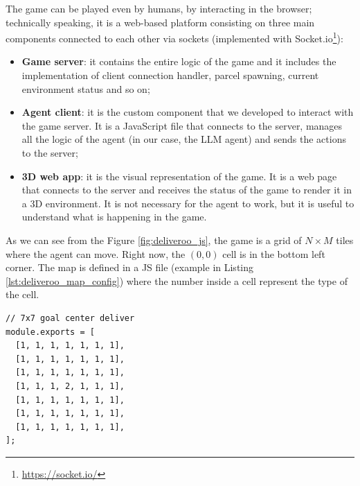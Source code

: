 The game can be played even by humans, by interacting in the browser; technically
speaking, it is a web-based platform consisting on three main components
connected to each other via sockets (implemented with Socket.io\footnote{\url{https://socket.io/}}):
\begin{itemize}
  \item \textbf{Game server}: it contains the entire logic of the game and it includes
    the implementation of client connection handler, parcel spawning, current environment
    status and so on;

  \item \textbf{Agent client}: it is the custom component that we developed to interact
    with the game server. It is a JavaScript file that connects to the server, manages
    all the logic of the agent (in our case, the LLM agent) and sends the
    actions to the server;

  \item \textbf{3D web app}: it is the visual representation of the game. It is
    a web page that connects to the server and receives the status of the game
    to render it in a 3D environment. It is not necessary for the agent to work,
    but it is useful to understand what is happening in the game.
\end{itemize}

As we can see from the Figure \ref{fig:deliveroo_js}, the game is a grid of
$N \times M$ tiles where the agent can move. Right now, the $(0, 0)$ cell is in
the bottom left corner. The map is defined in a JS file (example in Listing
\ref{lst:deliveroo_map_config}) where the number inside a cell represent the type
of the cell.

\vspace{10mm}
\begin{codewindow}
    \begin{lstlisting}
// 7x7 goal center deliver
module.exports = [
  [1, 1, 1, 1, 1, 1, 1],
  [1, 1, 1, 1, 1, 1, 1],
  [1, 1, 1, 1, 1, 1, 1],
  [1, 1, 1, 2, 1, 1, 1],
  [1, 1, 1, 1, 1, 1, 1],
  [1, 1, 1, 1, 1, 1, 1],
  [1, 1, 1, 1, 1, 1, 1],
];
\end{lstlisting}
\end{codewindow}
\vspace{10mm}

